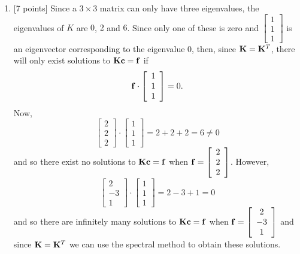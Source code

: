 \begin{solution}
\begin{enumerate}
\item {[7 points]} Since a $3\times3$ matrix can only have three eigenvalues, the eigenvalues of $K$ are $0$, $2$ and $6$. Since only one of these is zero and $\left[\begin{array}{c}1 \\ 1 \\ 1\end{array}\right]$ is an eigenvector corresponding to the eigenvalue $0$, then, since ${\bf K}={\bf K}^T$, there will only exist solutions to ${\bf K}{\bf c}={\bf f}$ if
\[
{\bf f}\cdot\left[\begin{array}{c}1 \\ 1 \\ 1\end{array}\right]=0.
\]
Now,
\[
\left[\begin{array}{c}2 \\ 2 \\ 2\end{array}\right]\cdot\left[\begin{array}{c}1 \\ 1 \\ 1\end{array}\right]=2+2+2=6\ne0
\]
and so there exist no solutions to ${\bf K}{\bf c}={\bf f}$ when ${\bf f}=\left[\begin{array}{c}2 \\ 2 \\ 2\end{array}\right]$.
However,
\[
\left[\begin{array}{c}2 \\ -3 \\ 1\end{array}\right]\cdot\left[\begin{array}{c}1 \\ 1 \\ 1\end{array}\right]=2-3+1=0
\]
and so there are infinitely many solutions to ${\bf K}{\bf c}={\bf f}$ when ${\bf f}=\left[\begin{array}{c}2 \\ -3 \\ 1\end{array}\right]$ and since ${\bf K}={\bf K}^T$ we can use the spectral method to obtain these solutions.


\end{enumerate}
\end{solution}
